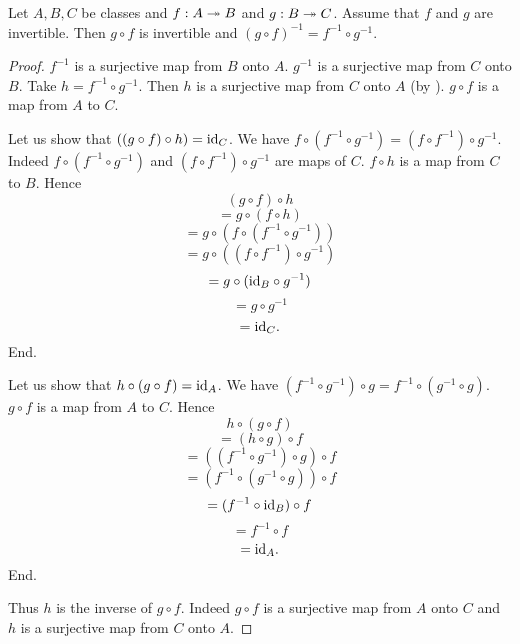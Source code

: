 \documentclass[10pt]{article}
\begin{document}
  \begin{forthel}
    \begin{proposition}
      Let $A, B, C$ be classes and $f : A \twoheadrightarrow B$ and $g : B \twoheadrightarrow C$.
      Assume that $f$ and $g$ are invertible.
      Then $g \circ f$ is invertible and $(g \circ f)^{-1} = f^{-1} \circ g^{-1}$.
    \end{proposition}
    \begin{proof}
      $f^{-1}$ is a surjective map from $B$ onto $A$.
      $g^{-1}$ is a surjective map from $C$ onto $B$.
      Take $h = f^{-1} \circ g^{-1}$.
      Then $h$ is a surjective map from $C$ onto $A$ (by ).
      $g \circ f$ is a map from $A$ to $C$.

      Let us show that $((g \circ f) \circ h) = \textrm{id}_{C}$.
        We have $f \circ (f^{-1} \circ g^{-1}) = (f \circ f^{-1}) \circ g^{-1}$.
        Indeed $f \circ (f^{-1} \circ g^{-1})$ and $(f \circ f^{-1}) \circ g^{-1}$ are maps of $C$.
        $f \circ h$ is a map from $C$ to $B$.
        Hence
        \[  (g \circ f) \circ h                           \]
        \[    = g \circ (f \circ h)                       \]
        \[    = g \circ (f \circ (f^{-1} \circ g^{-1}))   \]
        \[    = g \circ ((f \circ f^{-1}) \circ g^{-1})   \]
        \[    = g \circ (\textrm{id}_{B} \circ g^{-1})            \]
        \[    = g \circ g^{-1}                            \]
        \[    = \textrm{id}_{C}.                                  \]
      End.

      Let us show that $h \circ (g \circ f) = \textrm{id}_{A}$.
        We have $(f^{-1} \circ g^{-1}) \circ g = f^{-1} \circ (g^{-1} \circ g)$.
        $g \circ f$ is a map from $A$ to $C$.
        Hence
        \[  h \circ (g \circ f)                           \]
        \[    = (h \circ g) \circ f                       \]
        \[    = ((f^{-1} \circ g^{-1}) \circ g) \circ f   \]
        \[    = (f^{-1} \circ (g^{-1} \circ g)) \circ f   \]
        \[    = (f^{-1} \circ \textrm{id}_{B}) \circ f            \]
        \[    = f^{-1} \circ f                            \]
        \[    = \textrm{id}_{A}.                                  \]
      End.

      Thus $h$ is the inverse of $g \circ f$.
      Indeed $g \circ f$ is a surjective map from $A$ onto $C$ and $h$ is a surjective map from $C$ onto $A$.
    \end{proof}
  \end{forthel}
\end{document}
